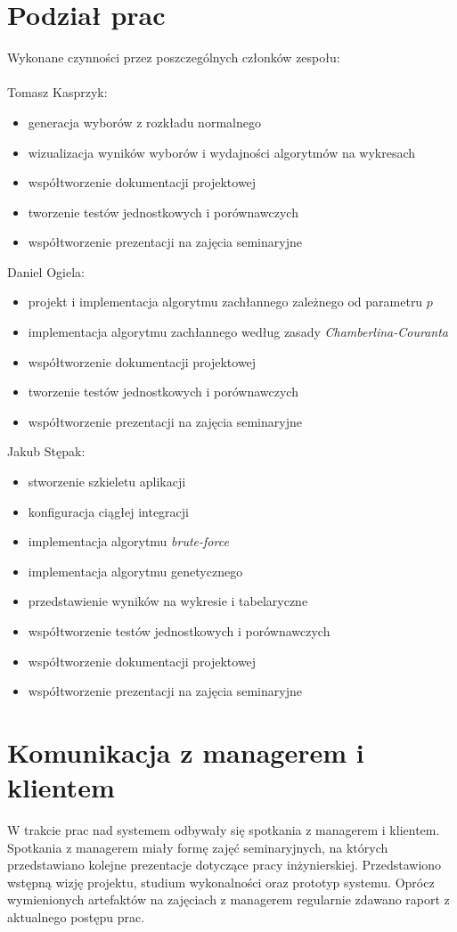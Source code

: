 \documentclass[pdflatex,11pt]{../aghdoc_version2}
\begin{document}
\section{Podział prac}
Wykonane czynności przez poszczególnych członków zespołu: \\ \\
Tomasz Kasprzyk:
\begin{itemize}
\item generacja wyborów z rozkładu normalnego
\item wizualizacja wyników wyborów i wydajności algorytmów na wykresach
\item współtworzenie dokumentacji projektowej
\item tworzenie testów jednostkowych i porównawczych
\item współtworzenie prezentacji na zajęcia seminaryjne
\end{itemize}
\newpage
Daniel Ogiela:
\begin{itemize}
\item projekt i implementacja algorytmu zachłannego zależnego od parametru $p$
\item implementacja algorytmu zachłannego według zasady \textit{Chamberlina-Couranta}
\item współtworzenie dokumentacji projektowej
\item tworzenie testów jednostkowych i porównawczych
\item współtworzenie prezentacji na zajęcia seminaryjne
\end{itemize}

Jakub Stępak:
\begin{itemize}
\item stworzenie szkieletu aplikacji
\item konfiguracja ciągłej integracji
\item implementacja algorytmu \textit{brute-force}
\item implementacja algorytmu genetycznego
\item przedstawienie wyników na wykresie i tabelaryczne
\item współtworzenie testów jednostkowych i porównawczych
\item współtworzenie dokumentacji projektowej
\item współtworzenie prezentacji na zajęcia seminaryjne
\end{itemize}

\section{Komunikacja z managerem i klientem}
W trakcie prac nad systemem odbywały się spotkania z managerem i klientem. Spotkania z
managerem miały formę zajęć seminaryjnych, na których przedstawiano kolejne prezentacje
dotyczące pracy inżynierskiej. Przedstawiono wstępną wizję projektu, studium wykonalności
oraz prototyp systemu. Oprócz wymienionych artefaktów na zajęciach z managerem
regularnie zdawano raport z aktualnego postępu prac.
\end{document}
